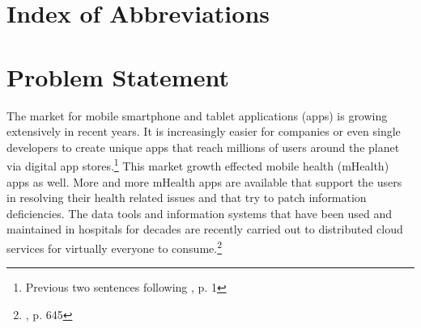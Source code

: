 \documentclass[
	a4paper,
	oneside,
	12pt,
	liststotocnumbered
]{article}
\let\cite\textcite
\begin{document}
\renewcommand{\figurename}{Figure}
\renewcommand{\tablename}{Table}
\renewcommand\thefigure{\arabic{section}-\arabic{figure}}
\renewcommand\thetable{Tab. \arabic{section}-\arabic{table}}
\newcommand{\todo}[1]{\textbf{\textsc{\textcolor{red}{TODO: #1}}}}

\newcommand{\mH}{mHealth }
\newcommand{\ap}{app provider}
\newcommand{\pp}{privacy policy}
\newcommand{\pps}{privacy policies}
\newcommand{\sca}{static code analysis}
\newcommand{\Sca}{Static code analysis}
\newcommand{\pra}{privacy risk assessment}




\tableofcontents
\newpage

\section*{Index of Abbreviations}
\begin{acronym}[TTTTTTTTTTTTTTTTTTTT]
\end{acronym}
\newpage

\normalsize
{}

\section{Problem Statement}
The market for mobile smartphone and tablet applications (apps) is growing extensively in recent years.
It is increasingly easier for companies or even single developers to create unique apps that reach millions of users around the planet via digital app stores.\footnote{Previous two sentences following \cite{Enck2011}, p. 1}
This market growth effected mobile health (\acs{mHealth}) apps as well. 
More and more \mH apps are available that support the users in resolving their health related issues and that try to patch information deficiencies. 
The data tools and information systems that have been used and maintained in hospitals for decades are recently carried out to distributed cloud services for virtually everyone to consume.\footnote{\cite{He2014a}, p. 645}
\end{document}
